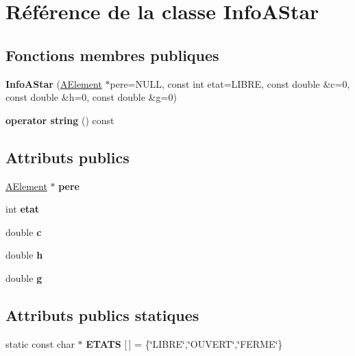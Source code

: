 \hypertarget{class_info_a_star}{}\section{Référence de la classe Info\+A\+Star}
\label{class_info_a_star}
\subsection*{Fonctions membres publiques}
\begin{DoxyCompactItemize}
\item 
\mbox{\label{class_info_a_star_ab0b10a72d677cc7a7d4d026682187846}} 
{\bfseries Info\+A\+Star} (\mbox{\hyperlink{class_a_element}{A\+Element}} $\ast$pere=N\+U\+LL, const int etat=L\+I\+B\+RE, const double \&c=0, const double \&h=0, const double \&g=0)
\item 
\mbox{\label{class_info_a_star_a23320afe214e3396ea18d60f7740d870}} 
{\bfseries operator string} () const
\end{DoxyCompactItemize}
\subsection*{Attributs publics}
\begin{DoxyCompactItemize}
\item 
\mbox{\label{class_info_a_star_a663c260f202c751402f8188e4d4ff184}} 
\mbox{\hyperlink{class_a_element}{A\+Element}} $\ast$ {\bfseries pere}
\item 
\mbox{\label{class_info_a_star_ae5053c50710f3af4713a1a596d556d53}} 
int {\bfseries etat}
\item 
\mbox{\label{class_info_a_star_af931324f084b7683ec829ca67406b962}} 
double {\bfseries c}
\item 
\mbox{\label{class_info_a_star_a8c947b77631448ab95e73e30d246c686}} 
double {\bfseries h}
\item 
\mbox{\label{class_info_a_star_a04bb119a33604c90fe764ddc3388b58c}} 
double {\bfseries g}
\end{DoxyCompactItemize}
\subsection*{Attributs publics statiques}
\begin{DoxyCompactItemize}
\item 
\mbox{\label{class_info_a_star_a04a96027e941e01728cd9b8bcf5bc51d}} 
static const char $\ast$ {\bfseries E\+T\+A\+TS} \mbox{[}$\,$\mbox{]} = \{\char`\"{}L\+I\+B\+RE\char`\"{},\char`\"{}O\+U\+V\+E\+RT\char`\"{},\char`\"{}F\+E\+R\+ME\char`\"{}\}
\end{DoxyCompactItemize}
